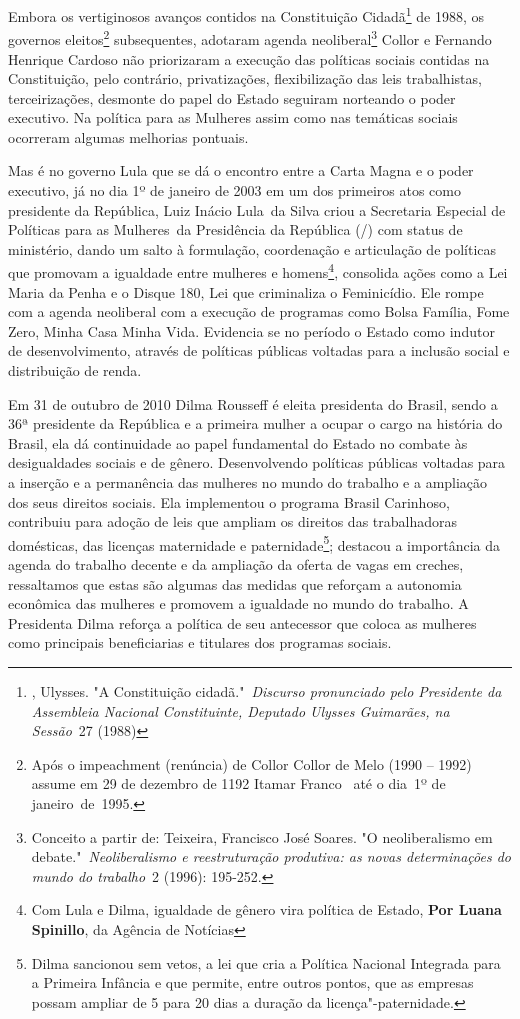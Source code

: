 Embora os vertiginosos avanços contidos na Constituição Cidadã\footnote{,
  Ulysses. "A Constituição cidadã."~\emph{Discurso pronunciado pelo
  Presidente da Assembleia Nacional Constituinte, Deputado Ulysses
  Guimarães, na Sessão}~27 (1988)} de 1988, os governos
eleitos\footnote{Após o impeachment (renúncia) de Collor Collor de Melo
  (1990 -- 1992) assume em 29 de dezembro de 1192 Itamar Franco~ até o
  dia~1º de janeiro~de~1995.}
subsequentes, adotaram agenda neoliberal\footnote{Conceito a partir de:
  Teixeira, Francisco José Soares. "O neoliberalismo em
  debate."~\emph{Neoliberalismo e reestruturação produtiva: as novas
  determinações do mundo do trabalho}~2 (1996): 195-252.} Collor e
Fernando Henrique Cardoso não priorizaram a execução das políticas
sociais contidas na Constituição, pelo contrário, privatizações,
flexibilização das leis trabalhistas, terceirizações, desmonte do papel
do Estado seguiram norteando o poder executivo. Na política para as
Mulheres assim como nas temáticas sociais ocorreram algumas melhorias
pontuais.

Mas é no governo Lula que se dá o encontro entre a Carta Magna e o poder
executivo, já no dia 1º de janeiro de 2003 em um dos primeiros atos como
presidente da República, Luiz
Inácio Lula~da Silva criou
a Secretaria Especial de Políticas para as
Mulheres~da Presidência da República (/) com status de ministério,
dando um salto à formulação, coordenação e articulação de políticas que
promovam a igualdade entre mulheres e homens\footnote{Com Lula e Dilma, igualdade de gênero vira política de Estado, \textbf{Por Luana Spinillo}, da Agência  de
  Notícias}, consolida ações como a Lei Maria da Penha
e o Disque 180, Lei que criminaliza o Feminicídio. Ele rompe com a
agenda neoliberal com a execução de programas como Bolsa Família, Fome
Zero, Minha Casa Minha Vida. Evidencia se no período o Estado como
indutor de desenvolvimento, através de políticas públicas voltadas para
a inclusão social e distribuição de renda.

Em 31 de outubro de 2010 Dilma Rousseff é eleita presidenta do Brasil,
sendo a 36ª presidente da República e a primeira mulher a ocupar o cargo
na história do Brasil, ela dá continuidade ao papel fundamental do
Estado no combate às desigualdades sociais e de gênero. Desenvolvendo
políticas públicas voltadas para a inserção e a permanência das mulheres
no mundo do trabalho e a ampliação dos seus direitos sociais. Ela
implementou o programa Brasil Carinhoso, contribuiu para adoção de leis
que ampliam os direitos das trabalhadoras domésticas, das licenças
maternidade e paternidade\footnote{Dilma sancionou sem vetos, a lei que
  cria a Política Nacional Integrada para a Primeira Infância e que
  permite, entre outros pontos, que as empresas possam ampliar de 5 para
  20 dias a duração da licença"-paternidade.}; destacou a importância da
agenda do trabalho decente e da ampliação da oferta de vagas em creches,
ressaltamos que estas são algumas das medidas que reforçam a autonomia
econômica das mulheres e promovem a igualdade no mundo do trabalho. A
Presidenta Dilma reforça a política de seu antecessor que coloca as
mulheres como principais beneficiarias e titulares dos programas
sociais.

